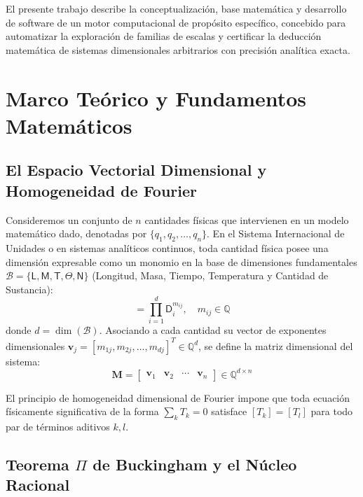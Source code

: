 \documentclass[11pt,a4paper]{article}
\theoremstyle{definition}
\theoremstyle{plain}
\theoremstyle{remark}
\begin{document}
El presente trabajo describe la conceptualización, base matemática y desarrollo de software de un motor computacional de propósito específico, concebido para automatizar la exploración de familias de escalas y certificar la deducción matemática de sistemas dimensionales arbitrarios con precisión analítica exacta.

\section{Marco Teórico y Fundamentos Matemáticos}

\subsection{El Espacio Vectorial Dimensional y Homogeneidad de Fourier}

Consideremos un conjunto de $n$ cantidades físicas que intervienen en un modelo matemático dado, denotadas por $\{q_1, q_2, \dots, q_n\}$. En el Sistema Internacional de Unidades o en sistemas analíticos continuos, toda cantidad física posee una dimensión expresable como un monomio en la base de dimensiones fundamentales $\mathcal{B} = \{\mathsf{L}, \mathsf{M}, \mathsf{T}, \mathsf{\Theta}, \mathsf{N}\}$ (Longitud, Masa, Tiempo, Temperatura y Cantidad de Sustancia):
\begin{equation}
    [q_j] = \prod_{i=1}^d \mathsf{D}_i^{m_{ij}}, \quad m_{ij} \in \mathbb{Q}
\end{equation}
donde $d = \dim(\mathcal{B})$. Asociando a cada cantidad su vector de exponentes dimensionales $\mathbf{v}_j = [m_{1j}, m_{2j}, \dots, m_{dj}]^T \in \mathbb{Q}^d$, se define la matriz dimensional del sistema:
\begin{equation}
    \mathbf{M} = \begin{bmatrix} \mathbf{v}_1 & \mathbf{v}_2 & \cdots & \mathbf{v}_n \end{bmatrix} \in \mathbb{Q}^{d \times n}
\end{equation}

El principio de homogeneidad dimensional de Fourier impone que toda ecuación físicamente significativa de la forma $\sum_k T_k = 0$ satisface $[T_k] = [T_l]$ para todo par de términos aditivos $k, l$.

\subsection{Teorema $\Pi$ de Buckingham y el Núcleo Racional}
\end{document}
